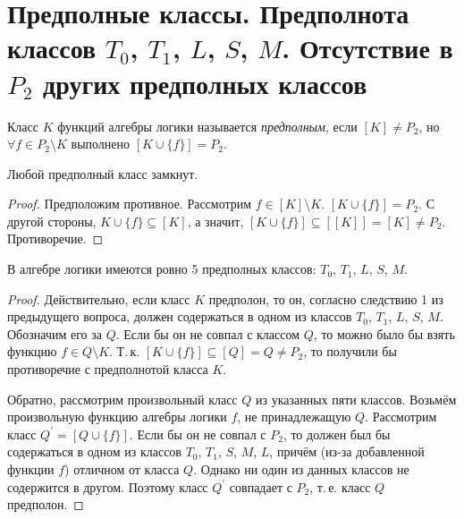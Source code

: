 \section{Предполные классы. Предполнота классов $T_0$, $T_1$, $L$, $S$, $M$. Отсутствие в $P_2$ других предполных классов}

\begin{definition}
    Класс $K$ функций алгебры логики называется \textit{предполным}, если $[K] \ne P_2$, но $\forall f \in P_2 \setminus K$ выполнено $[K \cup \{f\}] = P_2$.
\end{definition}

\begin{proposal}
    Любой предполный класс замкнут.
\end{proposal}

\begin{proof}
    Предположим противное. Рассмотрим $f \in [K] \setminus K$. $[K \cup \{f\}] = P_2$. С другой стороны, $K \cup \{f\} \subseteq [K]$, а значит, $[K \cup \{f\}] \subseteq [[K]] = [K] \ne P_2$. Противоречие.
\end{proof}

\begin{corollary}
    В алгебре логики имеются ровно 5 предполных классов: $T_0$, $T_1$, $L$, $S$, $M$.
\end{corollary}

\begin{proof}
    Действительно, если класс $K$ предполон, то он, согласно следствию 1 из предыдущего вопроса, должен содержаться в одном из классов $T_0$, $T_1$, $L$, $S$, $M$. Обозначим его за $Q$. Если бы он не совпал с классом $Q$, то можно было бы взять функцию $f \in Q \setminus K$. Т.\,к. $[K \cup \{f\}] \subseteq [Q] = Q \ne P_2$, то получили бы противоречие с предполнотой класса $K$.

    Обратно, рассмотрим произвольный класс $Q$ из указанных пяти классов. Возьмём произвольную функцию алгебры логики $f$, не принадлежащую $Q$. Рассмотрим класс $Q^\prime = [Q \cup \{f\}]$. Если бы он не совпал с $P_2$, то должен был бы содержаться в одном из классов $T_0$, $T_1$, $S$, $M$, $L$, причём (из-за добавленной функции $f$) отличном от класса $Q$. Однако ни один из данных классов не содержится в другом. Поэтому класс $Q^\prime$ совпадает с $P_2$, т.\,е. класс $Q$ предполон.
\end{proof}

